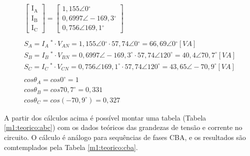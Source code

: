 \documentclass[a4paper,12pt,oneside,openany,table,xcdraw]{article}
\begin{document}
\begin{equation*}
\begin{array}{l}
\mathrm{\begin{bmatrix}
I_{A}\\
I_{B}\\
I_{C}
\end{bmatrix}} =\mathrm{\begin{bmatrix}
1,155\angle 0\mathrm{^{\circ }}\\
0,6997\angle -169,3\mathrm{^{\circ }}\\
0,756\angle 169,1\mathrm{^{\circ }}
\end{bmatrix}}\\
\\
S_{A} =I_{A} \ ^{*} \cdotp V_{AN} =1,155\angle 0\mathrm{^{\circ }} \cdotp 57,74\angle 0\mathrm{^{\circ }} =66,69\angle 0\mathrm{^{\circ }}[ VA]\\
S_{B} =I_{B} \ ^{*} \cdotp V_{BN} =0,6997\angle -169,3^{\circ } \cdotp 57,74\angle 120^{\circ } =40,4\angle 70,7^{\circ }[ VA]\\
S_{C} =I_{C} \ ^{*} \cdotp V_{CN} =0,756\angle 169,1^{\circ } \cdotp 57,74\angle 120^{\circ } =43,65\angle -70,9^{\circ }[ VA]\\
\\
cos\theta _{A} =cos0^{\circ } =1\\
cos\theta _{B} =cos70,7^{\circ } =0,331\\
cos\theta _{C} =cos\left( -70,9^{\circ }\right) =0,327
\end{array}
\end{equation*}

\vspace{0.5cm}
A partir dos cálculos acima é possível montar uma tabela (Tabela \ref{m1:teorico:abc}) com os dados teóricos das grandezas de tensão e corrente no circuito. O cálculo é análogo para sequências de fases CBA, e os resultados são comtemplados pela Tabela \ref{m1:teorico:cba}.
\vspace{0.4cm}

\begin{table}[H]
\centering \small {}
\caption{Dados teóricos para a montagem 1, em sequência ABC.}
\label{m1:teorico:abc}
\end{table}
\end{document}

